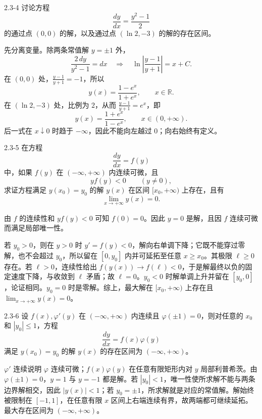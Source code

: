 \documentclass[UTF8,a4paper,11pt]{ctexart}
\begin{document}
\begin{problem}{2.3-4}
讨论方程
  \[
    \frac{dy}{dx}=\frac{y^2-1}{2}
  \]
  的通过点 $(0,0)$ 的解，以及通过点 $(\ln2,-3)$ 的解的存在区间。
\end{problem}

\begin{solution}
先分离变量。除两条常值解 $y=\pm1$ 外，
\[
\frac{2\,dy}{y^2-1}=dx
\quad\Longrightarrow\quad
\ln\left|\frac{y-1}{y+1}\right|=x+C.
\]
在 $(0,0)$ 处，$\frac{y-1}{y+1}=-1$，所以
\[
\boxed{y(x)=\frac{1-e^x}{1+e^x}},\qquad x\in\mathbb R.
\]
在 $(\ln2,-3)$ 处，比例为 $2$，从而 $\frac{y-1}{y+1}=e^x$，即
\[
\boxed{y(x)=\frac{1+e^x}{1-e^x}},\qquad x\in(0,+\infty).
\]
后一式在 $x\downarrow0$ 时趋于 $-\infty$，因此不能向左越过 $0$；向右始终有定义。
\end{solution}

\begin{problem}{2.3-5}
在方程
  \[
    \frac{dy}{dx}=f(y)
  \]
  中，如果 $f(y)$ 在 $(-\infty,+\infty)$ 内连续可微，且
  \[
    yf(y)<0\qquad (y\ne0),
  \]
  求证方程满足 $y(x_0)=y_0$ 的解 $y(x)$ 在区间 $[x_0,+\infty)$ 上存在，且有
  \[
    \lim_{x\to+\infty}y(x)=0.
  \]
\end{problem}

\begin{solution}
由 $f$ 的连续性和 $yf(y)<0$ 可知 $f(0)=0$。因此 $y=0$ 是解，且因 $f$ 连续可微而满足局部唯一性。

若 $y_0>0$，则在 $y>0$ 时 $y'=f(y)<0$，解向右单调下降；它既不能穿过零解，也不会超过 $y_0$，所以留在 $[0,y_0]$ 内并可延拓至任意 $x\ge x_0$。其极限 $\ell\ge0$ 存在。若 $\ell>0$，连续性给出 $f(y(x))\to f(\ell)<0$，于是解最终以负的固定速度下降，与收敛到 $\ell$ 矛盾；故 $\ell=0$。$y_0<0$ 时解单调上升并留在 $[y_0,0]$，论证相同。$y_0=0$ 时是零解。综上，最大解在 $[x_0,+\infty)$ 上存在且 $\boxed{\lim_{x\to+\infty}y(x)=0}$。
\end{solution}

\begin{problem}{2.3-6}
设 $f(x),\varphi'(y)$ 在 $(-\infty,+\infty)$ 内连续且 $\varphi(\pm1)=0$，则对任意的 $x_0$ 和 $|y_0|\le1$，方程
  \[
    \frac{dy}{dx}=f(x)\varphi(y)
  \]
  满足 $y(x_0)=y_0$ 的解 $y(x)$ 的存在区间为 $(-\infty,+\infty)$。
\end{problem}

\begin{solution}
$\varphi'$ 连续说明 $\varphi$ 连续可微；$f(x)\varphi(y)$ 在任意有限矩形内对 $y$ 局部利普希茨。由 $\varphi(\pm1)=0$，$y=1$ 与 $y=-1$ 都是解。若 $|y_0|<1$，唯一性使所求解不能与两条边界解相交，因此 $|y(x)|<1$；若 $y_0=\pm1$，所求解就是对应的常值解。解始终被限制在 $[-1,1]$，在任意有限 $x$ 区间上右端连续有界，故两端都可继续延拓。最大存在区间为 $\boxed{(-\infty,+\infty)}$。
\end{solution}
\end{document}
